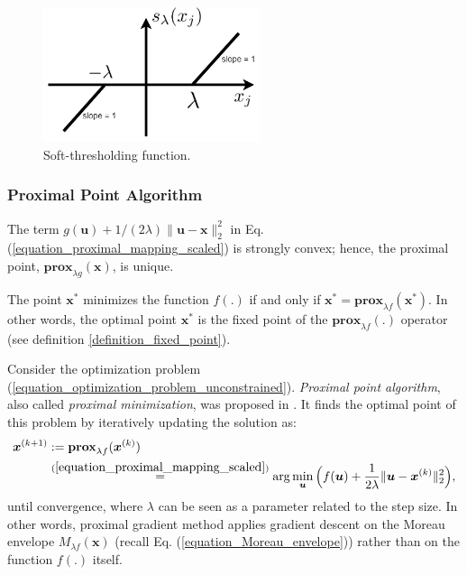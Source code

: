 \documentclass[lang=cn,10pt]{gorgeousnbook}
\numberwithin{equation}{section}%
\numberwithin{figure}{section}%
\begin{document}
\begin{figure}[!t]
\centering
\includegraphics[width=2.5in]{./images/soft_thresholding}
\caption{Soft-thresholding function.}
\label{figure_soft_thresholding}
\end{figure}

\subsubsection{Proximal Point Algorithm}

The term $g(\boldsymbol{u}) + 1 / (2\lambda) \|\boldsymbol{u} - \boldsymbol{x}\|_2^2$ in Eq. (\ref{equation_proximal_mapping_scaled}) is strongly convex; hence, the proximal point, $\textbf{prox}_{\lambda g}(\boldsymbol{x})$, is unique. 

\begin{lemma}
The point $\boldsymbol{x}^*$ minimizes the function $f(.)$ if and only if $\boldsymbol{x}^* = \textbf{prox}_{\lambda f}(\boldsymbol{x}^*)$.
In other words, the optimal point $\boldsymbol{x}^*$ is the fixed point of the $\textbf{prox}_{\lambda f}(.)$ operator (see definition \ref{definition_fixed_point}). 
\end{lemma}

Consider the optimization problem (\ref{equation_optimization_problem_unconstrained}). 
\textit{Proximal point algorithm}, also called \textit{proximal minimization}, was proposed in \cite{rockafellar1976monotone}. It finds the optimal point of this problem by iteratively updating the solution as:
\begin{align}
\boldsymbol{x}^{(k+1)} &:= \textbf{prox}_{\lambda f}(\boldsymbol{x}^{(k)}) \nonumber\\
&\overset{(\ref{equation_proximal_mapping_scaled})}{=} \arg\min_{\boldsymbol{u}} \Big( f(\boldsymbol{u}) + \frac{1}{2\lambda} \|\boldsymbol{u} - \boldsymbol{x}^{(k)}\|_2^2 \Big),
\end{align}
until convergence, where $\lambda$ can be seen as a parameter related to the step size. 
In other words, proximal gradient method applies gradient descent on the Moreau envelope $M_{\lambda f}(\boldsymbol{x})$ (recall Eq. (\ref{equation_Moreau_envelope})) rather than on the function $f(.)$ itself.
\end{document}
